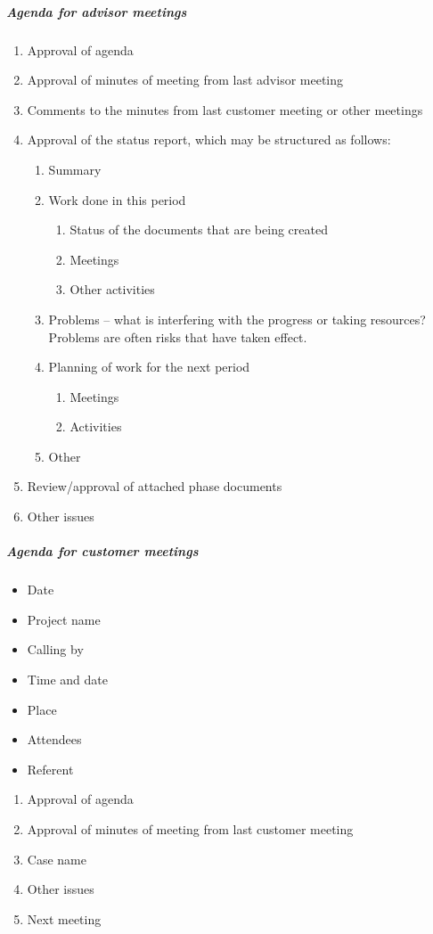 \subparagraph{Agenda for advisor meetings}\hfill
\newline
\begin{enumerate}
\item{}Approval of agenda 
\item{}Approval of minutes of meeting from last advisor meeting
\item{}Comments to the minutes from last customer meeting or other meetings
\item{}Approval of the status report, which may be structured as follows:
\begin{enumerate}
\item{} Summary
\item{} Work done in this period
\begin{enumerate}
\item{}Status of the documents that are being created
\item{}Meetings
\item{}Other activities
\end{enumerate}
\item{}Problems – what is interfering with the progress or taking resources? Problems are often risks that have taken effect.
\item{}Planning of work for the next period
\begin{enumerate}
\item{}Meetings
\item{}Activities
\end{enumerate}
\item{}Other
\end{enumerate}
\item{}Review/approval of attached phase documents
\item{}Other issues
\end{enumerate}

\subparagraph{Agenda for customer meetings} \hfill
\newline
\begin{itemize}
\item{}Date
\item{}Project name
\item{}Calling by
\item{}Time and date 
\item{}Place 
\item{}Attendees 
\item{}Referent
\end{itemize}

\begin{enumerate}
\item{}Approval of agenda
\item{}Approval of minutes of meeting from last customer meeting
\item{}Case name
\item{}Other issues
\item{}Next meeting
\end{enumerate}

